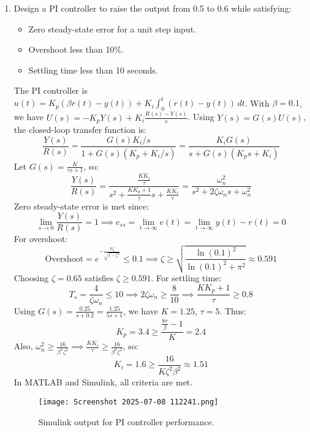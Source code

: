 \documentclass{article}
\begin{document}
\begin{enumerate}
  \item Design a PI controller to raise the output from 0.5 to 0.6 while satisfying:
  \begin{itemize}
    \item Zero steady-state error for a unit step input.
    \item Overshoot less than 10\%.
    \item Settling time less than 10 seconds.
  \end{itemize}
  The PI controller is $u(t) = K_p (\beta r(t) - y(t)) + K_i \int_{0}^{t} (r(t) - y(t)) \, dt$. With $\beta=0.1$, we have $U(s) = -K_p Y(s) + K_i \frac{R(s)-Y(s)}{s}$. Using $Y(s) = G(s)U(s)$, the closed-loop transfer function is:
  \begin{equation*}
    \frac{Y(s)}{R(s)} = \frac{G(s) K_i / s}{1 + G(s) (K_p + K_i / s)} = \frac{K_i G(s)}{s + G(s) (K_p s + K_i)}
  \end{equation*}
  Let $G(s) = \frac{K}{\tau s + 1}$, so:
  \begin{equation*}
    \frac{Y(s)}{R(s)} = \frac{\frac{K K_i}{\tau}}{s^2 + \frac{K K_p + 1}{\tau} s + \frac{K K_i}{\tau}} =
    \frac{\omega_n^2}{s^2 + 2\zeta \omega_n s + \omega_n^2}
  \end{equation*}
  Zero steady-state error is met since:
  \begin{equation*}
    \lim_{s \to 0} \frac{Y(s)}{R(s)} = 1 \implies e_{ss} = \lim_{t \to \infty} e(t) = \lim_{t \to \infty} y(t) - r(t) = 0
  \end{equation*}
  For overshoot:
  \begin{equation*}
    \text{Overshoot} = e^{-\frac{\pi \zeta}{\sqrt{1-\zeta^2}}} \leq 0.1 \implies \zeta \geq \sqrt{\frac{\ln(0.1)^2}{\ln(0.1)^2 + \pi^2}} \approx 0.591
  \end{equation*}
  Choosing $\zeta = 0.65$ satisfies $\zeta \geq 0.591$. For settling time:
  \begin{equation*}
    T_s = \frac{4}{\zeta \omega_n} \leq 10 \implies 2 \zeta \omega_n \geq \frac{8}{10} \implies \frac{K K_p + 1}{\tau} \geq 0.8
  \end{equation*}
  Using $G(s) = \frac{0.25}{s + 0.2} = \frac{1.25}{5s + 1}$, we have $K = 1.25$, $\tau = 5$. Thus:
  \begin{equation*}
    K_p = 3.4 \geq \frac{\frac{8 \tau}{\beta} - 1}{K} = 2.4
  \end{equation*}
  Also, $\omega_n^2 \geq \frac{16}{\beta^2 \zeta^2} \implies \frac{K K_i}{\tau} \geq \frac{16}{\beta^2 \zeta^2}$, so:
  \begin{equation*}
    K_i = 1.6 \geq \frac{16}{K \zeta^2 \beta^2} \approx 1.51
  \end{equation*}
  In MATLAB and Simulink, all criteria are met.
  \begin{figure}[h!]
    \centering
    \texttt{[image: Screenshot 2025-07-08 112241.png]}
    \caption{Simulink output for PI controller performance.}
    \label{fig:pi_performance}
  \end{figure}
\end{enumerate}
\end{document}
